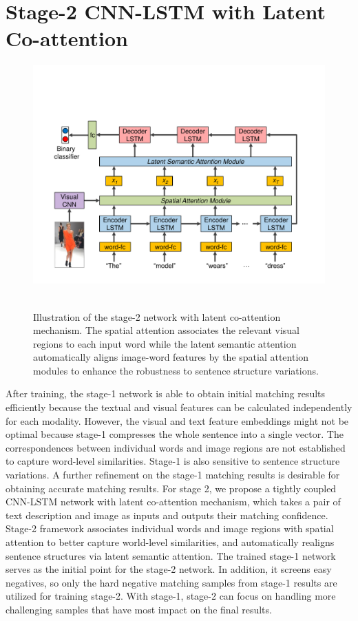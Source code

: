 \section{Stage-2 CNN-LSTM with Latent Co-attention}
\begin{figure}[t]
\begin{center}
\includegraphics[width=0.9\linewidth]{figures/textual_visual_matching/stage2_1.pdf} \ \\
\end{center}
\caption{Illustration of the stage-2 network with latent co-attention mechanism. The spatial attention associates the relevant visual regions to each input word while the latent semantic attention automatically aligns image-word features by the spatial attention modules to enhance the robustness to sentence structure variations.}
\label{fig:stage2}
\end{figure}

After training, the stage-1 network is able to obtain initial matching results efficiently because the textual and visual features can be calculated independently for each modality.
However, the visual and text feature embeddings might not be optimal because stage-1 compresses the whole sentence into a single vector. The correspondences between individual words and image regions are not established to capture word-level similarities. Stage-1 is also sensitive to sentence structure variations.
A further refinement on the stage-1 matching results is desirable for obtaining accurate matching results. For stage 2, we propose a tightly coupled CNN-LSTM network with latent co-attention mechanism, which takes a pair of text description and image as inputs and outputs their matching confidence.
Stage-2 framework associates individual words and image regions with spatial attention to better capture world-level similarities, and automatically realigns sentence structures via latent semantic attention.
The trained stage-1 network serves as the initial point for the stage-2 network. In addition, it screens easy negatives, so only the hard negative matching samples from stage-1 results are utilized for training stage-2.
With stage-1, stage-2 can focus on handling more challenging samples that have most impact on the final results.

